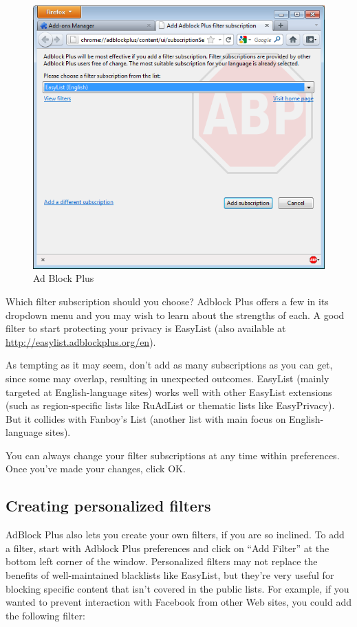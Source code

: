 \begin{figure}[htbp]
\centering
\includegraphics{abp_1.png}
\caption{Ad Block Plus}
\end{figure}

Which filter subscription should you choose? Adblock Plus offers a few
in its dropdown menu and you may wish to learn about the strengths of
each. A good filter to start protecting your privacy is EasyList (also
available at
\href{http://easylist.adblockplus.org/en}{http://easylist.adblockplus.org/en}).

As tempting as it may seem, don't add as many subscriptions as you can
get, since some may overlap, resulting in unexpected outcomes. EasyList
(mainly targeted at English-language sites) works well with other
EasyList extensions (such as region-specific lists like RuAdList or
thematic lists like EasyPrivacy). But it collides with Fanboy's List
(another list with main focus on English-language sites).

You can always change your filter subscriptions at any time within
preferences. Once you've made your changes, click OK.

\subsection{Creating personalized filters}

AdBlock Plus also lets you create your own filters, if you are so
inclined. To add a filter, start with Adblock Plus preferences and click
on ``Add Filter'' at the bottom left corner of the window. Personalized
filters may not replace the benefits of well-maintained blacklists like
EasyList, but they're very useful for blocking specific content that
isn't covered in the public lists. For example, if you wanted to prevent
interaction with Facebook from other Web sites, you could add the
following filter:

